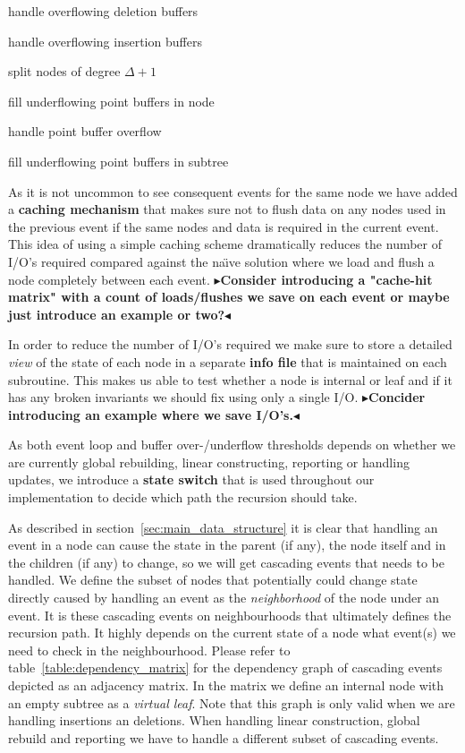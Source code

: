 \documentclass[twoside,11pt,openright]{report}
\newcommand{\todo}[1]{{\color[rgb]{.5,0,0}\textbf{$\blacktriangleright$#1$\blacktriangleleft$}}}
\begin{document}
\begin{inlinelist}
	\item handle overflowing deletion buffers
	\item handle overflowing insertion buffers
	\item split nodes of degree $\Delta+1$
	\item fill underflowing point buffers in node
	\item handle point buffer overflow
	\item fill underflowing point buffers in subtree
\end{inlinelist}

As it is not uncommon to see consequent events for the same node we have added a \textbf{caching mechanism} that makes sure not to flush data on any nodes used in the previous event if the same nodes and data is required in the current event. This idea of using a simple caching scheme dramatically reduces the number of I/O's required compared against the na\"{\i}ve solution where we load and flush a node completely between each event. \todo{Consider introducing a "cache-hit matrix" with a count of loads/flushes we save on each event or maybe just introduce an example or two?}

In order to reduce the number of I/O's required we make sure to store a detailed \textit{view} of the state of each node in a separate \textbf{info file} that is maintained on each subroutine. This makes us able to test whether a node is internal or leaf and if it has any broken invariants we should fix using only a single I/O. \todo{Concider introducing an example where we save I/O's.}

As both event loop and buffer over-/underflow thresholds depends on whether we are currently global rebuilding, linear constructing, reporting or handling updates, we introduce a \textbf{state switch} that is used throughout our implementation to decide which path the recursion should take.

As described in section~\ref{sec:main_data_structure} it is clear that handling an event in a node can cause the state in the parent (if any), the node itself and in the children (if any) to change, so we will get cascading events that needs to be handled. We define the subset of nodes that potentially could change state directly caused by handling an event as the \textit{neighborhood} of the node under an event. It is these cascading events on neighbourhoods that ultimately defines the recursion path. It highly depends on the current state of a node what event(s) we need to check in the neighbourhood. Please refer to table~\ref{table:dependency_matrix} for the dependency graph of cascading events depicted as an adjacency matrix. In the matrix we define an internal node with an empty subtree as a \textit{virtual leaf}. Note that this graph is only valid when we are handling insertions an deletions. When handling linear construction, global rebuild and reporting we have to handle a different subset of cascading events.
\end{document}
